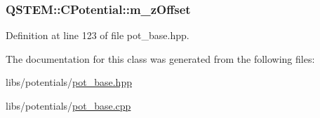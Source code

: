 \hypertarget{class_q_s_t_e_m_1_1_c_potential_a81aacf38febd7cdb6bc000315c9151b6}{
\subsubsection[{m\-\_\-z\-Offset}]{ Q\-S\-T\-E\-M\-::\-C\-Potential\-::m\-\_\-z\-Offset\hspace{0.3cm}{\ttfamily [protected]}}}\label{class_q_s_t_e_m_1_1_c_potential_a81aacf38febd7cdb6bc000315c9151b6}


Definition at line 123 of file pot\-\_\-base.\-hpp.



The documentation for this class was generated from the following files\-:\begin{DoxyCompactItemize}
\item 
libs/potentials/\hyperlink{pot__base_8hpp}{pot\-\_\-base.\-hpp}\item 
libs/potentials/\hyperlink{pot__base_8cpp}{pot\-\_\-base.\-cpp}\end{DoxyCompactItemize}
